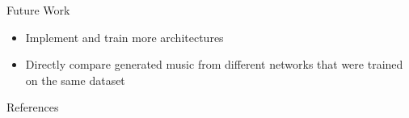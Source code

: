\documentclass[final,hyperref={pdfpagelabels=false}]{beamer}
\newcommand{\blocktextwidth}{0.93\textwidth}
\begin{document}
\begin{frame}[t]
\begin{columns}[t]
\begin{column}{0.6375\textwidth}
\begin{columns}[T]
\begin{column}{0.486\textwidth}
\vspace{-1em}



\begin{block}{Future Work}
\begin{minipage}[]{\blocktextwidth}
\begin{itemize}[leftmargin=*,labelindent=0pt,label={\color{black!40}$\bullet$}]
\item{Implement and train more architectures}
\item{Directly compare generated music from different networks that were trained on the same dataset}
\end{itemize}
\end{minipage}
\end{block}







\vspace{-1em}
{

\begin{block}{References}
\vspace{-.5\baselineskip}

\scriptsize{}
\end{block}
}



\end{column}
\end{columns}


\end{column} %
\end{columns} %



\end{frame} %
\end{document}
